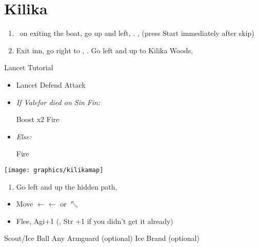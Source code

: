 \chapter{Kilika}

\begin{enumerate}
    \item \sd\ on exiting the boat, go up and left, \sd. \skippablefmv[2:00], (press Start immediately after skip) \sd
    \item Exit inn, go right to \wakka, \sd. Go left and up to Kilika Woods, \sd
\end{enumerate}
\begin{battle}{Lancet Tutorial}
    \begin{itemize}
        \item \sd
        \kimahrif Lancet
        \switch{\kimahri}{\wakka}
        \wakkaf Defend
        \tidusf Attack
        \item \textit{If Valefor died on Sin Fin:}
        \begin{itemize}
            \switch{\lulu}{\yuna}
            \summon{\valefor}
            \valeforf Boost x2
            \valeforf Fire
        \end{itemize}
        \item \textit{Else:}
        \begin{itemize}
            \luluf Fire
        \end{itemize}
    \end{itemize}
\end{battle}
\texttt{[image: graphics/kilikamap]}
\begin{enumerate}[resume]
    \item Go left and up the hidden path, 
\end{enumerate}
\begin{spheregrid}
    \begin{itemize}
        \tidusf
        \begin{itemize}
            \item Move $\leftarrow\leftarrow$ or $\nwarrow$
            \item Flee, Agi+1 (, Str +1 if you didn't get it already)
        \end{itemize}
    \end{itemize}
\end{spheregrid}
\begin{equip}
    \begin{itemize}
        \wakkaf Scout/Ice Ball
        \wakkaf Any Armguard (optional)
        \tidusf Ice Brand (optional)
    \end{itemize}
\end{equip}
